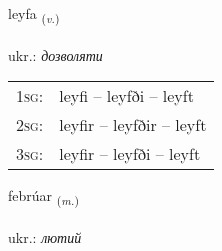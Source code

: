 \documentclass[frontgrid, backgrid]{flacards}\usepackage[]{graphicx}\usepackage[]{xcolor}
\begin{document}
\renewcommand{\flhead}{\vskip5pt \fboxsep=0pt {\small\bfseries\footnotesize Sagnorð | дієслово}}
\renewcommand{\fcfoot}{\vskip5pt \fboxsep=0pt \hspace{2pt}{\small\bfseries\footnotesize 1K}}

\renewcommand{\blhead}{\vskip5pt {\small\bfseries\footnotesize Sagnorð | дієслово }}
\renewcommand{\bcfoot}{\vskip5pt \hspace{2pt}{\small\bfseries\footnotesize 1K}}


{leyfa \small{\textsubscript{(\textit{v.})}} \\[1ex] %
\textphonetic{[leiːva]} \\
ukr.: \emph{дозволяти} \\  [2ex]
\renewcommand*{\arraystretch}{0.8}
\begin{tabular}{p{1cm}l}
\textsc{1sg}: & leyfi -- leyfði -- leyft \\ 
\textsc{2sg}: & leyfir -- leyfðir -- leyft \\ 
\textsc{3sg}: & leyfir -- leyfði -- leyft \\ 
\end{tabular}
}

\renewcommand{\flhead}{\vskip5pt \fboxsep=0pt {\small\bfseries\footnotesize Nafnorð | іменник}}
\renewcommand{\fcfoot}{\vskip5pt \fboxsep=0pt \hspace{2pt}{\small\bfseries\footnotesize 1K}}

\renewcommand{\blhead}{\vskip5pt {\small\bfseries\footnotesize Nafnorð | іменник }}
\renewcommand{\bcfoot}{\vskip5pt \hspace{2pt}{\small\bfseries\footnotesize 1K}}


{febrúar \small{\textsubscript{(\textit{m.})}} \\[1ex] %
\textphonetic{[fɛːpruar]} \\
ukr.: \emph{лютий} \\  [2ex]
\renewcommand*{\arraystretch}{0.8}
}
\end{document}
